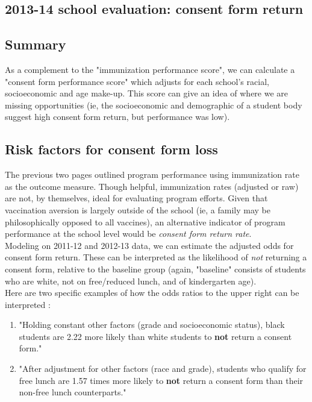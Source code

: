 \documentclass{article}
\begin{document}
\begin{multicols}{2}
\begin{center}
\section*{2013-14 school evaluation: consent form return}
\end{center}
\begin{multicols}{2}


\subsection*{Summary}
As a complement to the "immunization performance score", we can calculate a "consent form performance score" which adjusts for each school's racial, socioeconomic and age make-up.  This score can give an idea of where we are missing opportunities (ie, the socioeconomic and demographic of a student body suggest high consent form return, but performance was low). \\


\subsection*{Risk factors for consent form loss}

The previous two pages outlined program performance using immunization rate as the outcome measure.  Though helpful, immunization rates (adjusted or raw) are not, by themselves, ideal for evaluating program efforts.  Given that vaccination aversion is largely outside of the school (ie, a family may be philosophically opposed to all vaccines), an alternative indicator of program performance at the school level would be \emph{consent form return rate}. \\

Modeling on 2011-12 and 2012-13 data, we can estimate the adjusted odds for consent form return.  These can be interpreted as the likelihood of \emph{not} returning a consent form, relative to the baseline group (again, "baseline" consists of students who are white, not on free/reduced lunch, and of kindergarten age). \\


Here are two specific examples of how the odds ratios to the upper right can be interpreted :\begin{enumerate}
\item "Holding constant other factors (grade and socioeconomic status), black students are 2.22 more likely than white students to  \textbf{not} return a consent form."
\item "After adjustment for other factors (race and grade), students who qualify for free lunch are 1.57 times more likely to \textbf{not} return a consent form than their non-free lunch counterparts."



\end{enumerate}
\end{multicols}
\end{multicols}
\end{document}
